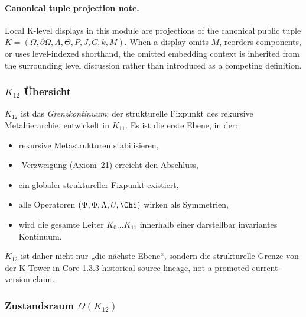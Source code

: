 



\paragraph{Canonical tuple projection note.}
Local K-level displays in this module are projections of the canonical public tuple \(K=(\Omega,\partial\Omega,A,\Theta,P,J,C,k,M)\). When a display omits \(M\), reorders components, or uses level-indexed shorthand, the omitted embedding context is inherited from the surrounding level discussion rather than introduced as a competing definition.

\subsubsection{$K_{12}$ Übersicht}
\label{sec:k12-overview}

$K_{12}$ ist das \emph{Grenzkontinuum}: der strukturelle Fixpunkt des
rekursive Metahierarchie, entwickelt in $K_{11}$.
Es ist die erste Ebene, in der:

\begin{itemize}
    \item rekursive Metastrukturen stabilisieren,
    \item-Verzweigung (Axiom~21) erreicht den Abschluss,
    \item ein globaler struktureller Fixpunkt existiert,
    \item alle Operatoren $(\Psi,\Phi,\Lambda,U,\Chi)$ wirken als Symmetrien,
    \item wird die gesamte Leiter $K_0\dots K_{11}$ innerhalb einer darstellbar
          invariantes Kontinuum.
\end{itemize}

$K_{12}$ ist daher nicht nur „die nächste Ebene“, sondern die strukturelle Grenze von
der K-Tower in Core 1.3.3 historical source lineage, not a promoted current-version claim.

\subsubsection{Zustandsraum $\Omega(K_{12})$}


